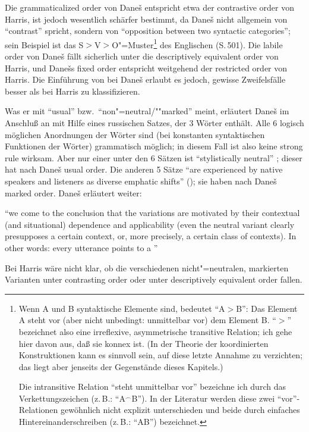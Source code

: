 \documentclass[output=paper]{langsci/langscibook}
\begin{document}
Die grammaticalized order von Dane\v{s} entspricht etwa der contrastive order von Harris, ist jedoch wesentlich schärfer bestimmt, da Dane\v{s} nicht allgemein
von "`contrast"' spricht, sondern von "`opposition between two syntactic
categories"'; sein Beispiel ist das S$>$V$>$O"=Muster\footnote{%
  Wenn A und B syntaktische Elemente sind, bedeutet "`A$>$B"': Das Element A steht vor (aber nicht
  unbedingt: unmittelbar vor) dem Element B. "`$>$"' bezeichnet also eine irreflexive, asymmetrische
  transitive Relation;  ich gehe hier davon aus, daß sie konnex ist. (In der Theorie der
  koordinierten Konstruktionen kann es sinnvoll sein, auf diese letzte Annahme zu verzichten; das
  liegt aber jenseits der Gegenstände dieses Kapitels.)   
  
  Die intransitive Relation "`steht unmittelbar vor"' bezeichne ich durch das Verkettungszeichen
  (z.\,B.:   "`A$^{\smallfrown}$B"'). In der Literatur werden diese zwei  "`vor"'-Relationen gewöhnlich
  nicht explizit unterschieden und beide durch einfaches Hintereinanderschreiben (z.\,B.: "`AB"') 
  bezeichnet.%
}
des Englischen (S.\,501). Die labile order von Dane\v{s} fällt sicherlich unter die descriptively equivalent order von Harris, und Dane\v{s}s
fixed order entspricht weitgehend der restricted order von Harris. Die
Einführung von  bei Dane\v{s} erlaubt es jedoch, gewisse
Zweifelsfälle besser als bei Harris zu klassifizieren. 

Was er mit "`usual"' bzw.\ "`non"=neutral/""marked"' meint, erläutert Dane\v{s} im Anschluß an \citet{Jakobson1963} mit Hilfe eines russischen Satzes,
der 3 Wörter enthält.  Alle 6 logisch möglichen Anordnungen der Wörter
sind (bei konstanten syntaktischen Funktionen der Wörter) grammatisch
möglich; in diesem Fall ist also keine strong rule wirksam. Aber nur
einer unter den 6 Sätzen ist "`stylistically neutral"' \citep[268]{Jakobson1963}; dieser hat nach Dane\v{s} usual order. Die anderen 5 Sätze "`are
experienced by native speakers and listeners as diverse emphatic shifts"' (\citeyear[269]{Jakobson1963});
sie haben nach Dane\v{s} marked order. Dane\v{s} erläutert weiter:
\begin{exe}
\ex\label{ex:1-1-3}
"`we come to the conclusion that the variations are motivated by their contextual (and situational) dependence and applicability (even the neutral variant clearly presupposes a certain context, or, more precisely, a certain class
of contexts). In other words: every utterance points to a "' \citep[504]{Danes1967}
\end{exe}
Bei Harris wäre nicht klar, ob die verschiedenen nicht"=neutralen, markierten Varianten unter contrasting order oder unter descriptively equivalent order fallen.
\end{document}
